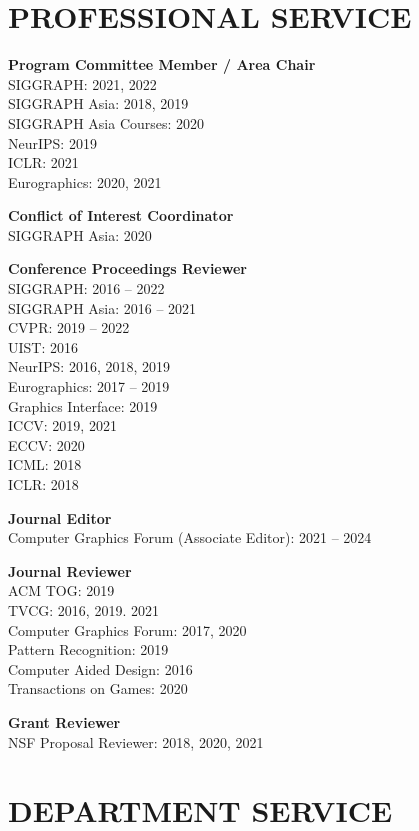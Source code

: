 \documentclass[line,margin]{res}
\begin{document}
\begin{resume}

\section{PROFESSIONAL SERVICE}

\textbf{Program Committee Member / Area Chair}\\
SIGGRAPH: 2021, 2022\\
SIGGRAPH Asia: 2018, 2019\\
SIGGRAPH Asia Courses: 2020\\
NeurIPS: 2019\\
ICLR: 2021\\
Eurographics: 2020, 2021

\textbf{Conflict of Interest Coordinator}\\
SIGGRAPH Asia: 2020

\textbf{Conference Proceedings Reviewer}\\
SIGGRAPH: 2016 -- 2022\\
SIGGRAPH Asia: 2016 -- 2021\\
CVPR: 2019 -- 2022\\
UIST: 2016\\
NeurIPS: 2016, 2018, 2019\\
Eurographics: 2017 --  2019\\
Graphics Interface: 2019\\
ICCV: 2019, 2021\\
ECCV: 2020\\
ICML: 2018\\
ICLR: 2018

\textbf{Journal Editor}\\
Computer Graphics Forum (Associate Editor): 2021 -- 2024

\textbf{Journal Reviewer}\\
ACM TOG: 2019\\
TVCG: 2016, 2019. 2021\\
Computer Graphics Forum: 2017, 2020\\
Pattern Recognition: 2019\\
Computer Aided Design: 2016\\
Transactions on Games: 2020

\textbf{Grant Reviewer}\\
NSF Proposal Reviewer: 2018, 2020, 2021


\section{DEPARTMENT SERVICE}


\end{resume}
\end{document}
